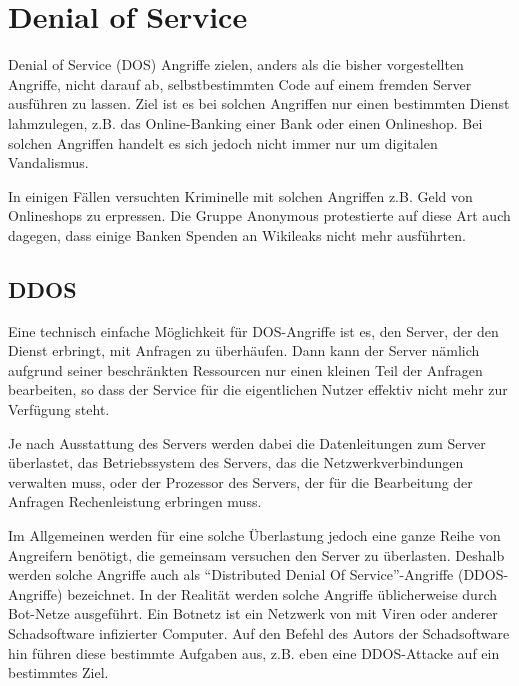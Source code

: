 \section{Denial of Service}
Denial of Service (DOS) Angriffe zielen, anders als die bisher vorgestellten Angriffe, nicht darauf ab, selbstbestimmten Code auf einem fremden Server ausführen zu lassen.
Ziel ist es bei solchen Angriffen nur einen bestimmten Dienst lahmzulegen, z.B. das Online-Banking einer Bank oder einen Onlineshop.
Bei solchen Angriffen handelt es sich jedoch nicht immer nur um digitalen Vandalismus.

In einigen Fällen versuchten Kriminelle mit solchen Angriffen z.B. Geld von Onlineshops zu erpressen.
Die Gruppe Anonymous protestierte auf diese Art auch dagegen, dass einige Banken Spenden an Wikileaks nicht mehr ausführten.\\

\subsection{DDOS}
Eine technisch einfache Möglichkeit für DOS-Angriffe ist es, den Server, der den Dienst erbringt, mit Anfragen zu überhäufen. Dann kann der Server nämlich aufgrund seiner beschränkten Ressourcen nur einen kleinen Teil der Anfragen bearbeiten, so dass der Service für die eigentlichen Nutzer effektiv nicht mehr zur Verfügung steht.

Je nach Ausstattung des Servers werden dabei die Datenleitungen zum Server überlastet, das Betriebssystem des Servers, das die Netzwerkverbindungen verwalten muss, oder der Prozessor des Servers, der für die Bearbeitung der Anfragen Rechenleistung erbringen muss.

Im Allgemeinen werden für eine solche Überlastung jedoch eine ganze Reihe von Angreifern benötigt, die gemeinsam versuchen den Server zu überlasten.
Deshalb werden solche Angriffe auch als "`Distributed Denial Of Service"'-Angriffe (DDOS-Angriffe) bezeichnet.
In der Realität werden solche Angriffe üblicherweise durch Bot-Netze ausgeführt.
Ein Botnetz ist ein Netzwerk von mit Viren oder anderer Schadsoftware infizierter Computer.
Auf den Befehl des Autors der Schadsoftware hin führen diese bestimmte Aufgaben aus, z.B. eben eine DDOS-Attacke auf ein bestimmtes Ziel.\\

